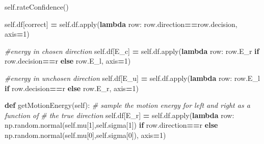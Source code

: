 \documentclass[12pt,twoside]{reedthesis}
\newenvironment{Shaded}{\begin{snugshade}}{\end{snugshade}}
\newcommand{\BuiltInTok}[1]{#1}
\newcommand{\CommentTok}[1]{\textcolor[rgb]{0.56,0.35,0.01}{\textit{#1}}}
\newcommand{\ControlFlowTok}[1]{\textcolor[rgb]{0.13,0.29,0.53}{\textbf{#1}}}
\newcommand{\DecValTok}[1]{\textcolor[rgb]{0.00,0.00,0.81}{#1}}
\newcommand{\KeywordTok}[1]{\textcolor[rgb]{0.13,0.29,0.53}{\textbf{#1}}}
\newcommand{\NormalTok}[1]{#1}
\newcommand{\OperatorTok}[1]{\textcolor[rgb]{0.81,0.36,0.00}{\textbf{#1}}}
\newcommand{\StringTok}[1]{\textcolor[rgb]{0.31,0.60,0.02}{#1}}
\newcommand{\VariableTok}[1]{\textcolor[rgb]{0.00,0.00,0.00}{#1}}
\begin{document}
\begin{Shaded}
\begin{Highlighting}[]
        \VariableTok{self}\NormalTok{.rateConfidence()}
        
        \VariableTok{self}\NormalTok{.df[}\StringTok{\textquotesingle{}correct\textquotesingle{}}\NormalTok{] }\OperatorTok{=} \VariableTok{self}\NormalTok{.df.}\BuiltInTok{apply}\NormalTok{(}\KeywordTok{lambda}\NormalTok{ row: }
\NormalTok{               row.direction}\OperatorTok{==}\NormalTok{row.decision, axis}\OperatorTok{=}\DecValTok{1}\NormalTok{)}
        
        \CommentTok{\#energy in chosen direction}
        \VariableTok{self}\NormalTok{.df[}\StringTok{\textquotesingle{}E\_c\textquotesingle{}}\NormalTok{] }\OperatorTok{=} \VariableTok{self}\NormalTok{.df.}\BuiltInTok{apply}\NormalTok{(}\KeywordTok{lambda}\NormalTok{ row: }
\NormalTok{                                       row.E\_r }\ControlFlowTok{if}\NormalTok{ row.decision}\OperatorTok{==}\StringTok{\textquotesingle{}r\textquotesingle{}} 
                                       \ControlFlowTok{else}\NormalTok{ row.E\_l, axis}\OperatorTok{=}\DecValTok{1}\NormalTok{)}
        
        \CommentTok{\#energy in unchosen direction}
        \VariableTok{self}\NormalTok{.df[}\StringTok{\textquotesingle{}E\_u\textquotesingle{}}\NormalTok{] }\OperatorTok{=} \VariableTok{self}\NormalTok{.df.}\BuiltInTok{apply}\NormalTok{(}\KeywordTok{lambda}\NormalTok{ row: }
\NormalTok{                                       row.E\_l }\ControlFlowTok{if}\NormalTok{ row.decision}\OperatorTok{==}\StringTok{\textquotesingle{}r\textquotesingle{}} 
                                       \ControlFlowTok{else}\NormalTok{ row.E\_r, axis}\OperatorTok{=}\DecValTok{1}\NormalTok{)}
        
    \KeywordTok{def}\NormalTok{ getMotionEnergy(}\VariableTok{self}\NormalTok{):}
    \CommentTok{\# sample the motion energy for left and right as a function of }
    \CommentTok{\# the true direction}
        \VariableTok{self}\NormalTok{.df[}\StringTok{\textquotesingle{}E\_r\textquotesingle{}}\NormalTok{] }\OperatorTok{=} \VariableTok{self}\NormalTok{.df.}\BuiltInTok{apply}\NormalTok{(}\KeywordTok{lambda}\NormalTok{ row: }
\NormalTok{               np.random.normal(}\VariableTok{self}\NormalTok{.mu[}\DecValTok{1}\NormalTok{],}\VariableTok{self}\NormalTok{.sigma[}\DecValTok{1}\NormalTok{]) }
               \ControlFlowTok{if}\NormalTok{ row.direction}\OperatorTok{==}\StringTok{\textquotesingle{}r\textquotesingle{}} 
               \ControlFlowTok{else}\NormalTok{ np.random.normal(}\VariableTok{self}\NormalTok{.mu[}\DecValTok{0}\NormalTok{],}\VariableTok{self}\NormalTok{.sigma[}\DecValTok{0}\NormalTok{]),}
\NormalTok{               axis}\OperatorTok{=}\DecValTok{1}\NormalTok{)}


\end{Highlighting}
\end{Shaded}
\end{document}

